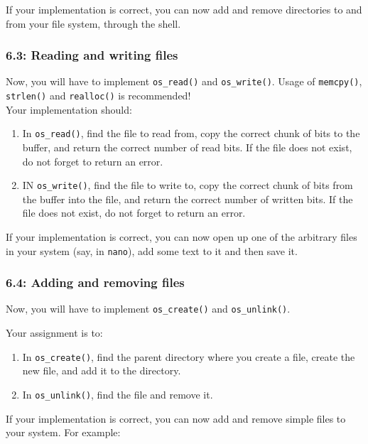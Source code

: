 \documentclass [a4,twoside,11pt] {article}
\begin{document}
    If your implementation is correct, you can now add and remove directories to and from your file system, through the shell.

    \subsubsection{6.3: Reading and writing files}
    
    Now, you will have to implement \texttt{os\_read()} and \texttt{os\_write()}. Usage of \texttt{memcpy()}, \texttt{strlen()} and \texttt{realloc()} is recommended!\\

    Your implementation should:

    \begin{enumerate}
        \item In \texttt{os\_read()}, find the file to read from, copy the correct chunk of bits to the buffer, and return the correct number of read bits. If the file does not exist, do not forget to return an error.
        \item IN \texttt{os\_write()}, find the file to write to, copy the correct chunk of bits from the buffer into the file, and return the correct number of written bits. If the file does not exist, do not forget to return an error.
    \end{enumerate}

    If your implementation is correct, you can now open up one of the arbitrary files in your system (say, in \texttt{nano}), add some text to it and then save it.

    \subsubsection{6.4: Adding and removing files}
    
    Now, you will have to implement \texttt{os\_create()} and \texttt{os\_unlink()}.

    Your assignment is to:

    \begin{enumerate}
        \item In \texttt{os\_create()}, find the parent directory where you create a file, create the new file, and add it to the directory.
        \item In \texttt{os\_unlink()}, find the file and remove it.
    \end{enumerate}

    If your implementation is correct, you can now add and remove simple files to your system. For example:
\end{document}
